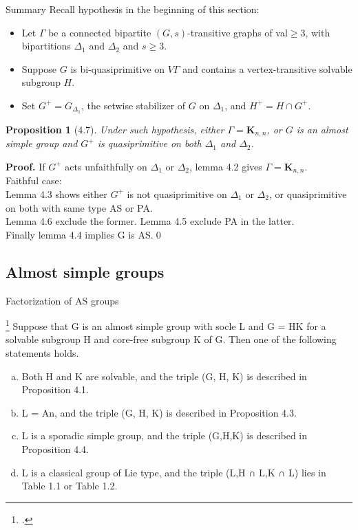 \documentclass{beamer}
\def\proof#1{\textbf{Proof.}{#1}\qed}
\newtheorem{proposition}{Proposition}[theorem]
\begin{document}
\begin{frame}{Summary}
Recall hypothesis in the beginning of this section:
\begin{itemize}
	\item Let $\Gamma$ be a connected bipartite $(G,s)$-transitive graphs of val$\geq 3$, with bipartitions $\Delta_1$ and $\Delta_2$ and $s\geq 3$.
	\item Suppose $G$ is bi-quasiprimitive on $V\Gamma$ and contains a vertex-transitive solvable subgroup $H$. 
	\item Set $G^+=G_{\Delta_1}$, the setwise stabilizer of $G$ on $\Delta_1$, and $H^+=H\cap G^+$.
\end{itemize}

\begin{proposition}[4.7]
Under such hypothesis, either $\Gamma=\mathbf{K}_{n,n}$, or $G$ is an almost simple group and $G^+$ is quasiprimitive on both $\Delta_1$ and $\Delta_2$.
\end{proposition}
\proof{ If $G^+$ acts unfaithfully on $\Delta_1$ or $\Delta_2$, lemma 4.2 gives $\Gamma=\mathbf{K}_{n,n}$.\\
Faithful case: \\Lemma 4.3 shows either $G^+$ is not quasiprimitive on $\Delta_1$ or $\Delta_2$, or quasiprimitive on both with same type AS or PA.\\Lemma 4.6 exclude the former. Lemma 4.5 exclude PA in the latter.\\Finally lemma 4.4 implies G is AS.}
\end{frame}

\subsection{Almost simple groups}

\begin{frame}{Factorization of AS groups}
\begin{Theorem}\footcite{LI2022factorizations}
Suppose that G is an almost simple group with socle L and G = HK for a solvable subgroup H and core-free subgroup K of G. Then one of the following statements holds.
\begin{enumerate}[(a)]
	\item Both H and K are solvable, and the triple (G, H, K) is described in Proposition 4.1.
	\item L = An, and the triple (G, H, K) is described in Proposition 4.3.
	\item L is a sporadic simple group, and the triple (G,H,K) is described in Proposition 4.4.
	\item L is a classical group of Lie type, and the triple (L,H ∩ L,K ∩ L) lies in Table 1.1 or Table 1.2.
\end{enumerate}
\end{Theorem}
\end{frame}
\end{document}
